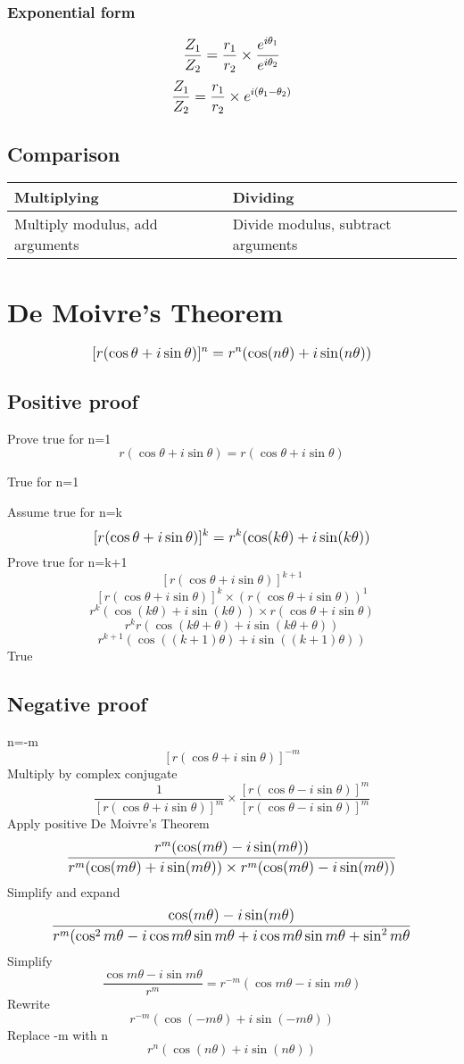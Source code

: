 \documentclass{article}[18pt]
\begin{document}
\subsubsection{Exponential form}
$$\mathlarger{\frac{Z_1}{Z_2}=\frac{r_1}{r_2}\times\frac{e^{i\theta_1}}{e^{i\theta_2}}}$$
$$\mathlarger{\frac{Z_1}{Z_2}=\frac{r_1}{r_2}\times e^{i(\theta_1-\theta_2)}}$$
\subsection{Comparison}
\begin{tabularx}{\textwidth}{|X|X|}
\hline
Multiplying&Dividing\\
\hline	
Multiply modulus, add arguments&Divide modulus, subtract arguments\\
\hline
\end{tabularx}
\newpage
\section{De Moivre's Theorem}
\textcolor{red}{$$\mathlarger{[r(\cos\theta+i\sin\theta)]^n=r^n(\cos(n\theta)+i\sin(n\theta))}$$}
\subsection{Positive proof}
Prove true for n=1
$$r(\cos\theta+i\sin\theta)=r(\cos\theta+i\sin\theta)$$
\begin{center}
True for n=1
\end{center}
Assume true for n=k
$$\mathlarger{[r(\cos\theta+i\sin\theta)]^k=r^k(\cos(k\theta)+i\sin(k\theta))}$$
Prove true for n=k+1
$$[r(\cos\theta+i\sin\theta)]^{k+1}$$
$$[r(\cos\theta+i\sin\theta)]^k\times(r(\cos\theta+i\sin\theta))^1$$
$$r^k(\cos(k\theta)+i\sin(k\theta))\times r(\cos\theta+i\sin\theta)$$
$$r^kr(\cos(k\theta+\theta)+i\sin(k\theta+\theta))$$
$$r^{k+1}(\cos((k+1)\theta)+i\sin((k+1)\theta))$$
True
\subsection{Negative proof}
n=-m
$$[r(\cos\theta+i\sin\theta)]^{-m}$$
Multiply by complex conjugate
$$\frac{1}{[r(\cos\theta+i\sin\theta)]^m}\times\frac{[r(\cos\theta-i\sin\theta)]^m}{[r(\cos\theta-i\sin\theta)]^m}$$
Apply positive De Moivre's Theorem
$$\mathlarger{\frac{r^m(\cos(m\theta)-i\sin(m\theta))}{r^m(\cos(m\theta)+i\sin(m\theta))\times r^m(\cos(m\theta)-i\sin(m\theta))}}$$
Simplify and expand
$$\mathlarger{\frac{\cos(m\theta)-i\sin(m\theta)}{r^m(\cos^2m\theta-i\cos m\theta\sin m\theta+i\cos m\theta\sin m\theta+\sin^2m\theta}}$$
Simplify
$$\frac{\cos m\theta-i\sin m\theta}{r^m}=r^{-m}(\cos m\theta-i\sin m\theta)$$
Rewrite
$$r^{-m}(\cos(-m\theta)+i\sin(-m\theta))$$
Replace -m with n
$$r^n(\cos(n\theta)+i\sin(n\theta))$$
\newpage
\end{document}
